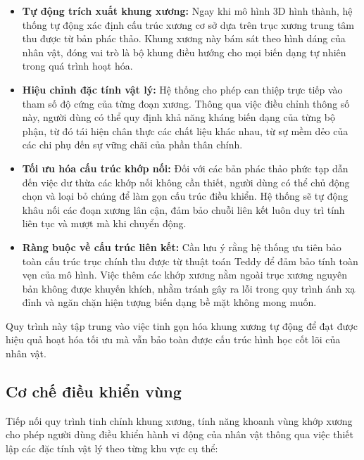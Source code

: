 \documentclass{report}
\begin{document}
\begin{itemize}
    \item \textbf{Tự động trích xuất khung xương:} Ngay khi mô hình 3D hình thành, hệ thống tự động xác định cấu trúc xương cơ sở dựa trên trục xương trung tâm thu được từ bản phác thảo. Khung xương này bám sát theo hình dáng của nhân vật, đóng vai trò là bộ khung điều hướng cho mọi biến dạng tự nhiên trong quá trình hoạt hóa.
    
    \item \textbf{Hiệu chỉnh đặc tính vật lý:} Hệ thống cho phép can thiệp trực tiếp vào tham số độ cứng của từng đoạn xương. Thông qua việc điều chỉnh thông số này, người dùng có thể quy định khả năng kháng biến dạng của từng bộ phận, từ đó tái hiện chân thực các chất liệu khác nhau, từ sự mềm dẻo của các chi phụ đến sự vững chãi của phần thân chính.

    \item \textbf{Tối ưu hóa cấu trúc khớp nối:} Đối với các bản phác thảo phức tạp dẫn đến việc dư thừa các khớp nối không cần thiết, người dùng có thể chủ động chọn và loại bỏ chúng để làm gọn cấu trúc điều khiển. Hệ thống sẽ tự động khâu nối các đoạn xương lân cận, đảm bảo chuỗi liên kết luôn duy trì tính liên tục và mượt mà khi chuyển động.

    \item \textbf{Ràng buộc về cấu trúc liên kết:} Cần lưu ý rằng hệ thống ưu tiên bảo toàn cấu trúc trục chính thu được từ thuật toán Teddy để đảm bảo tính toàn vẹn của mô hình. Việc thêm các khớp xương nằm ngoài trục xương nguyên bản không được khuyến khích, nhằm tránh gây ra lỗi trong quy trình ánh xạ đỉnh và ngăn chặn hiện tượng biến dạng bề mặt không mong muốn.
\end{itemize}

Quy trình này tập trung vào việc tinh gọn hóa khung xương tự động để đạt được hiệu quả hoạt hóa tối ưu mà vẫn bảo toàn được cấu trúc hình học cốt lõi của nhân vật.

\subsection{Cơ chế điều khiển vùng}

Tiếp nối quy trình tinh chỉnh khung xương, tính năng khoanh vùng khớp xương cho phép người dùng điều khiển hành vi động của nhân vật thông qua việc thiết lập các đặc tính vật lý theo từng khu vực cụ thể:
\end{document}

